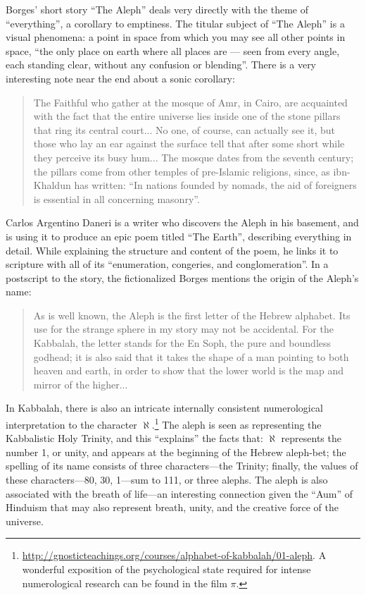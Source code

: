 \documentclass{thesis}
\begin{document}
	Borges' short story ``The Aleph''\cite{borges_aleph_2004} deals very directly with the theme of ``everything'', a corollary to emptiness. The titular subject of ``The Aleph'' is a visual phenomena: a point in space from which you may see all other points in space, ``the only place on earth where all places are --- seen from every angle, each standing clear, without any confusion or blending''. There is a very interesting note near the end about a sonic corollary:
	
	\begin{quote}
	The Faithful who gather at the mosque of Amr, in Cairo, are acquainted with the fact that the entire universe lies inside one of the stone pillars that ring its central court... No one, of course, can actually see it, but those who lay an ear against the surface tell that after some short while they perceive its busy hum... The mosque dates from the seventh century; the pillars come from other temples of pre-Islamic religions, since, as ibn-Khaldun has written: ``In nations founded by nomads, the aid of foreigners is essential in all concerning masonry''.
	\end{quote}
	
	Carlos Argentino Daneri is a writer who discovers the Aleph in his basement, and is using it to produce an epic poem titled ``The Earth'', describing everything in detail. While explaining the structure and content of the poem, he links it to scripture with all of its ``enumeration, congeries, and conglomeration''. In a postscript to the story, the fictionalized Borges mentions the origin of the Aleph's name:
	
	\begin{quote}
	As is well known, the Aleph is the first letter of the Hebrew alphabet. Its use for the strange sphere in my story may not be accidental. For the Kabbalah, the letter stands for the En Soph, the pure and boundless godhead; it is also said that it takes the shape of a man pointing to both heaven and earth, in order to show that the lower world is the map and mirror of the higher...
	\end{quote}
	
	In Kabbalah, there is also an intricate internally consistent numerological interpretation to the character $\aleph$.\footnote{\url{http://gnosticteachings.org/courses/alphabet-of-kabbalah/01-aleph}. A wonderful exposition of the psychological state required for intense numerological research can be found in the film $\pi$.} The aleph is seen as representing the Kabbalistic Holy Trinity, and this ``explains'' the facts that: $\aleph$ represents the number 1, or unity, and appears at the beginning of the Hebrew aleph-bet; the spelling of its name consists of three characters---the Trinity; finally, the values of these characters---80, 30, 1---sum to 111, or three alephs. The aleph is also associated with the breath of life---an interesting connection given the ``Aum'' of Hinduism that may also represent breath, unity, and the creative force of the universe.
	
\end{document}
